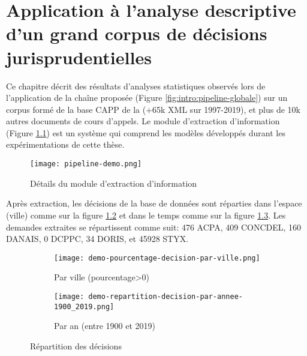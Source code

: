\chapter[Application à l'analyse descriptive d'un grand corpus]{Application à l'analyse descriptive d'un grand corpus de décisions jurisprudentielles}
\label{chap:demo}
Ce chapitre décrit des résultats d'analyses statistiques observés lors de l'application de la chaîne proposée (Figure \ref{fig:intro:pipeline-globale}) sur un corpus formé de la base CAPP de la \citet{dila2019capp} (+65k XML sur 1997-2019), et plus de 10k autres documents de cours d'appels. Le module d'extraction d'information (Figure \ref{fig:demo:module-extraction}) est un système qui comprend les modèles développés durant les expérimentations de cette thèse. 



\begin{figure}[!htb]
	\centering 
	\texttt{[image: pipeline-demo.png]}
	\caption{Détails du module d'extraction d'information}\label{fig:demo:module-extraction}
\end{figure}

Après extraction, les décisions de la base de données sont réparties dans l'espace (ville) comme sur la figure \ref{fig:demo:doc-per-city} et dans le temps comme sur la figure \ref{fig:demo:doc-per-year}. Les demandes extraites se répartissent comme suit: 476 ACPA, 409 CONCDEL, 160 DANAIS, 0 DCPPC, 34 DORIS, et 45928 STYX.  

\begin{figure}[ht]
	\centering
	\begin{subfigure}[ht]{0.55\textwidth}
		\centering
		\centering
		\texttt{[image: demo-pourcentage-decision-par-ville.png]}
		\caption{Par ville (pourcentage>0)} \label{fig:demo:doc-per-city}
	\end{subfigure} 
	\begin{subfigure}[ht]{0.43\textwidth}
		\centering
		\texttt{[image: demo-repartition-decision-par-annee-1900\_2019.png]}
		\caption{Par an (entre 1900 et 2019)} \label{fig:demo:doc-per-year}
	\end{subfigure}
	\caption{Répartition des décisions} \label{fig:demo:docs-distribution-over-time-and-space}
\end{figure}


